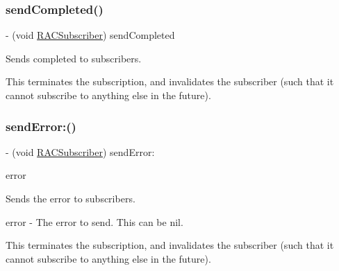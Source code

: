 \subsubsection{\texorpdfstring{send\+Completed()}{sendCompleted()}\hspace{0.1cm}{\footnotesize\ttfamily [3/3]}}
{\footnotesize\ttfamily -\/ (void \mbox{\hyperlink{interface_r_a_c_subscriber}{R\+A\+C\+Subscriber}}) send\+Completed \begin{DoxyParamCaption}{ }\end{DoxyParamCaption}\hspace{0.3cm}{\ttfamily [required]}}

Sends completed to subscribers.

This terminates the subscription, and invalidates the subscriber (such that it cannot subscribe to anything else in the future). \mbox{\label{protocol_r_a_c_subscriber_01-p_a70712a2213c3b1ac2d06b3634e924974}} 
\subsubsection{\texorpdfstring{send\+Error\+:()}{sendError:()}\hspace{0.1cm}{\footnotesize\ttfamily [1/3]}}
{\footnotesize\ttfamily -\/ (void \mbox{\hyperlink{interface_r_a_c_subscriber}{R\+A\+C\+Subscriber}}) send\+Error\+: \begin{DoxyParamCaption}\item[{(N\+S\+Error $\ast$)}]{error }\end{DoxyParamCaption}\hspace{0.3cm}{\ttfamily [required]}}

Sends the error to subscribers.

error -\/ The error to send. This can be {\ttfamily nil}.

This terminates the subscription, and invalidates the subscriber (such that it cannot subscribe to anything else in the future). \mbox{\label{protocol_r_a_c_subscriber_01-p_a70712a2213c3b1ac2d06b3634e924974}} 
